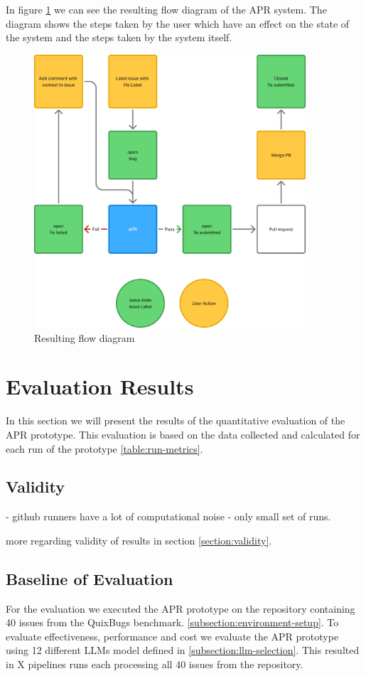 In figure \ref{fig:flow} we can see the resulting flow diagram of the APR system. The diagram shows the steps taken by the user which have an effect on the state of the system and the steps taken by the system itself.
\begin{figure}[H]
    \centering
    \includegraphics[width=0.9\textwidth]{images/flowcharts/flowresult.png}
    \caption{Resulting flow diagram}
    \label{fig:flow}
\end{figure}

\section{Evaluation Results}
In this section we will present the results of the quantitative evaluation of the APR prototype. This evaluation is based on the data collected and calculated for each run of the prototype \ref{table:run-metrics}.

\subsection{Validity}
- github runners have a lot of computational noise
- only small set of runs.

more regarding validity of results in section \ref{section:validity}.

\subsection{Baseline of Evaluation}
For the evaluation we executed the APR prototype on the repository containing 40 issues from the QuixBugs benchmark. \ref{subsection:environment-setup}. To evaluate effectiveness, performance and cost we evaluate the APR prototype using 12 different LLMs model defined in \ref{subsection:llm-selection}. This resulted in X pipelines runs each processing all 40 issues from the repository.
